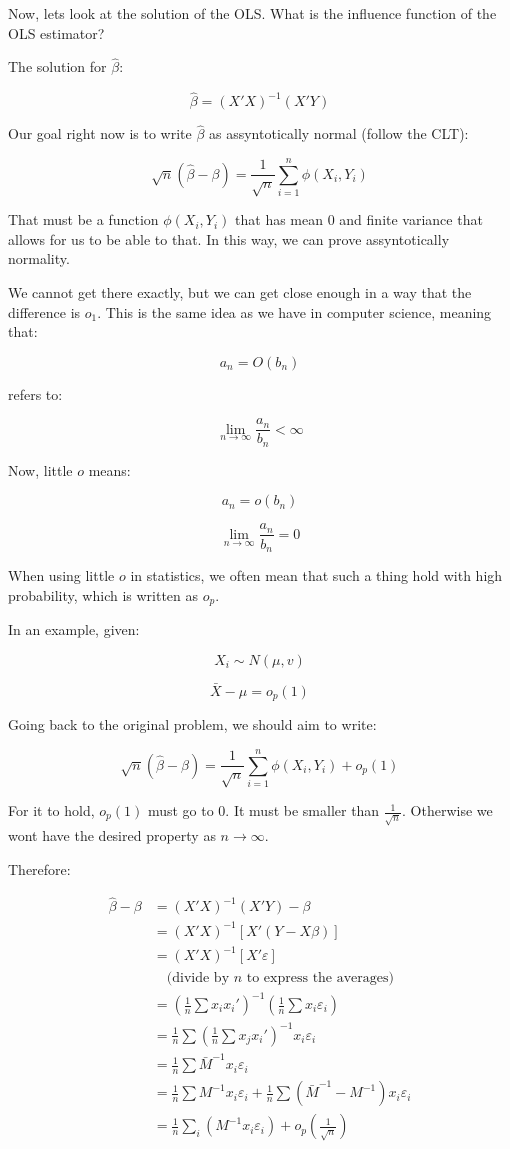 \documentclass{article}
\begin{document}
Now, lets look at the solution of the OLS. What is the influence function of the OLS estimator?

The solution for $\hat{\beta}$:

$$
\hat{\beta} = (X'X)^{-1} (X'Y)
$$

Our goal right now is to write $\hat{\beta}$ as assyntotically normal (follow the CLT):

$$
\sqrt{n}(\hat{\beta} - \beta) = \dfrac{1}{\sqrt{n}} \sum_{i=1}^{n} \phi (X_i, Y_i)
$$

That must be a function $\phi (X_i, Y_i)$ that has mean 0 and finite variance that allows for us to be able to that. In this way, we can prove assyntotically normality.

We cannot get there exactly, but we can get close enough in a way that the difference is $o_1$. This is the same idea as we have in computer science, meaning that:

$$
a_n = O(b_n)
$$

refers to:

$$
\lim_{n \to \infty} \frac{a_n}{b_n} < \infty
$$

Now, little $o$ means:

$$
a_n = o(b_n)
$$

$$
\lim_{n \to \infty} \frac{a_n}{b_n} = 0
$$

When using little $o$ in statistics, we often mean that such a thing hold with high probability, which is written as $o_p$.

In an example, given:

$$
X_i \sim N(\mu, v)
$$

$$
\bar{X} - \mu = o_p(1)
$$

Going back to the original problem, we should aim to write:

$$
\sqrt{n}(\hat{\beta} - \beta) = \dfrac{1}{\sqrt{n}} \sum_{i=1}^{n} \phi (X_i, Y_i) + o_p(1)
$$

For it to hold, $o_p(1)$ must go to 0. It must be smaller than $\frac{1}{\sqrt{n}}$. Otherwise we wont have the desired property as $n \to \infty$.

Therefore:

\begin{align*}
    \hat{\beta} - \beta
    &= (X'X)^{-1} (X'Y) - \beta \\
    &= (X'X)^{-1} \left[ X' (Y - X\beta) \right] \\
    &= (X'X)^{-1} \left[ X' \varepsilon \right] \\
    &\quad \text{(divide by $n$ to express the averages)} \\
    &= \left( \frac{1}{n} \sum x_i x_i' \right)^{-1} \left( \frac{1}{n} \sum x_i \varepsilon_i \right) \\
    &= \frac{1}{n} \sum \left( \frac{1}{n} \sum x_j  x_i' \right)^{-1} x_i \varepsilon_i \\
    &= \frac{1}{n} \sum {\bar{M}}^{-1} x_i \varepsilon_i \\
    &= \frac{1}{n} \sum {M}^{-1} x_i \varepsilon_i + \frac{1}{n} \sum ({\bar{M}}^{-1} - {M}^{-1}) x_i \varepsilon_i \\
    &= \frac{1}{n} \sum_i (M^{-1} x_i \varepsilon_i) + o_p \left(\frac{1}{\sqrt{n}} \right)
\end{align*}
\end{document}
